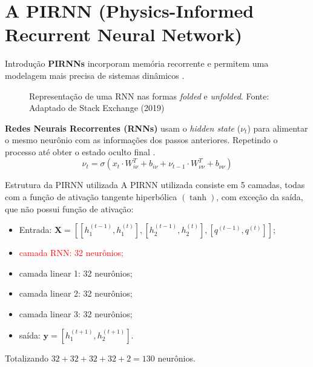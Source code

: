 \section{A PIRNN (Physics-Informed Recurrent Neural Network)}

\begin{frame}{Introdução}
  \textbf{PIRNNs} incorporam memória recorrente e permitem uma modelagem mais precisa de sistemas dinâmicos \parencite{zheng_2023}.
  \\ \vspace{0.4cm}
  \begin{figure}
    \centering
    
    \caption{Representação de uma RNN nas formas \textit{folded} e \textit{unfolded}. Fonte: Adaptado de Stack Exchange (2019)}
  \end{figure}
\end{frame}

\begin{frame}
  \textbf{Redes Neurais Recorrentes (RNNs)} usam o \textit{hidden state} ($\nu_t$) para alimentar o mesmo neurônio com as informações dos passos anteriores. Repetindo o processo até obter o estado oculto final \parencite{pytorch_2024}.
  \[
    \nu_t = \sigma(x_t \cdot W_{i\nu}^T + b_{i\nu} + \nu_{t-1} \cdot W_{\nu\nu}^T + b_{\nu\nu})
  \]
\end{frame}

\begin{frame}{Estrutura da PIRNN utilizada}
  A PIRNN utilizada consiste em 5 camadas, todas com a função de ativação tangente hiperbólica $(\tanh)$, com exceção da saída, que não possui função de ativação:

  \begin{itemize}
    \item Entrada: $\mathbf{X} = [[h_1^{(t-1)}, h_1^{(t)}], [h_2^{(t-1)}, h_2^{(t)}], [q^{(t-1)}, q^{(t)}]]$;
    \item \textcolor{red}{camada RNN: 32 neurônios;}
    \item camada linear 1: 32 neurônios;
    \item camada linear 2: 32 neurônios;
    \item camada linear 3: 32 neurônios;
    \item saída: $\mathbf{y} = [h_1^{(t+1)}, h_2^{(t+1)}]$.
  \end{itemize}

  Totalizando $32+32+32+32+2=130$ neurônios.
\end{frame}

